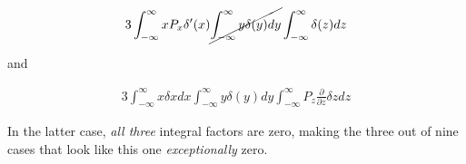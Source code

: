 \documentclass[paper=a4, fontsize=11pt]{scrartcl} %
\newcommand{\partd}[2]{\frac{\partial #1}{\partial #2}}
\numberwithin{equation}{section} %
\numberwithin{figure}{section} %
\numberwithin{table}{section} %
\begin{document}
\begin{align}
3\int_{-\infty}^{\infty}xP_x\delta'(x)\cancel{\int_{-\infty}^{\infty}y\delta(y)dy}\int_{-\infty}^{\infty}\delta(z)dz
\end{align}

and 

\begin{align}
3\int_{-\infty}^{\infty}x\delta{x}dx\int_{-\infty}^{\infty}y\delta(y)dy\int_{-\infty}^{\infty}P_z\partd{}{z}\delta{z}dz
\end{align}

In the latter case, \textit{all three} integral factors are zero, making the three out of nine cases that look like this one \textit{exceptionally} zero.
\end{document}

